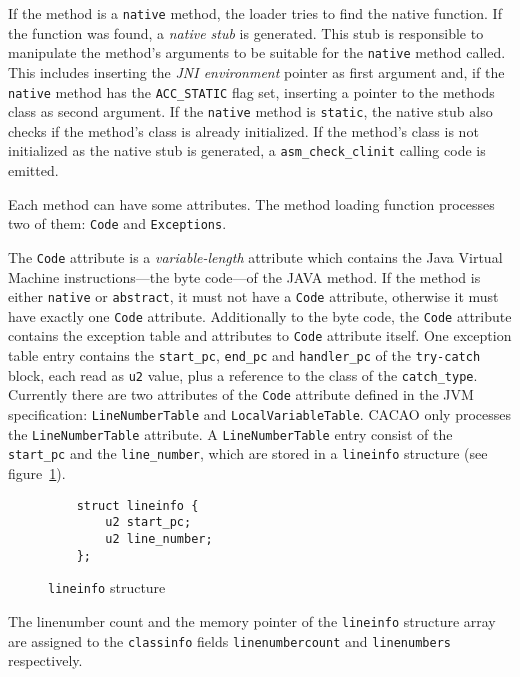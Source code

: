 If the method is a \texttt{native} method, the loader tries to find
the native function. If the function was found, a \textit{native stub}
is generated. This stub is responsible to manipulate the method's
arguments to be suitable for the \texttt{native} method called. This
includes inserting the \textit{JNI environment} pointer as first
argument and, if the \texttt{native} method has the
\texttt{ACC\_STATIC} flag set, inserting a pointer to the methods
class as second argument. If the \texttt{native} method is
\texttt{static}, the native stub also checks if the method's class is
already initialized. If the method's class is not initialized as the
native stub is generated, a \texttt{asm\_check\_clinit} calling code
is emitted.

Each method can have some attributes. The method loading function
processes two of them: \texttt{Code} and \texttt{Exceptions}.

The \texttt{Code} attribute is a \textit{variable-length} attribute
which contains the Java Virtual Machine instructions---the byte
code---of the JAVA method. If the method is either \texttt{native} or
\texttt{abstract}, it must not have a \texttt{Code} attribute,
otherwise it must have exactly one \texttt{Code}
attribute. Additionally to the byte code, the \texttt{Code} attribute
contains the exception table and attributes to \texttt{Code} attribute
itself. One exception table entry contains the \texttt{start\_pc},
\texttt{end\_pc} and
\texttt{handler\_pc} of the \texttt{try-catch} block, each read as
\texttt{u2} value, plus a reference to the class of the
\texttt{catch\_type}. Currently there are two attributes of the
\texttt{Code} attribute defined in the JVM specification:
\texttt{LineNumberTable} and \texttt{LocalVariableTable}. CACAO only
processes the \texttt{LineNumberTable} attribute. A
\texttt{LineNumberTable} entry consist of the \texttt{start\_pc} and
the \texttt{line\_number}, which are stored in a \texttt{lineinfo}
structure (see figure~\ref{lineinfostructure}).

\begin{figure}[h]
\begin{verbatim}
    struct lineinfo {
        u2 start_pc;
        u2 line_number;
    };
\end{verbatim}
\caption{\texttt{lineinfo} structure}
\label{lineinfostructure}
\end{figure}

The linenumber count and the memory pointer of the \texttt{lineinfo}
structure array are assigned to the \texttt{classinfo} fields
\texttt{linenumbercount} and \texttt{linenumbers} respectively.

